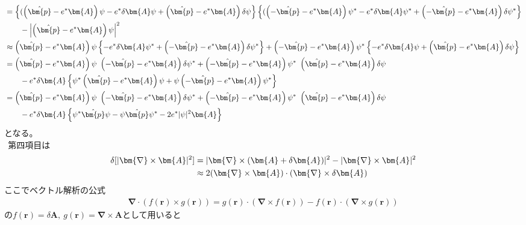 \documentclass[dvipdfmx, 11pt, a4paper]{jsarticle}
\numberwithin{equation}{section}
\theoremstyle{definition}
\begin{document}
\begin{derivationBox}
\begin{align}
            &= \left\{ (\left( \hat{\bm{p}} -e^*\bm{A} \right) \psi -e^* \delta \bm{A} \psi  + \left( \hat{\bm{p}} -e^*\bm{A}  \right)  \delta \psi  \right\} \left\{ (\left( -\hat{\bm{p}} -e^*\bm{A} \right) \psi^* -e^*\delta \bm{A} \psi^*+ \left( -\hat{\bm{p}} -e^*\bm{A}  \right)  \delta \psi^*  \right\} \notag \\
            &\ \ \ \ \ \ - \left|  \left( \hat{\bm{p}} -e^*\bm{A} \right) \psi \right|^2 \notag \\
            &\approx  \left( \hat{\bm{p}} -e^*\bm{A} \right) \psi \left\{ -e^*\delta \bm{A} \psi^*+ \left( -\hat{\bm{p}} -e^*\bm{A}  \right)  \delta \psi^*  \right\} + \left( -\hat{\bm{p}} -e^*\bm{A} \right) \psi^* \left\{ -e^* \delta \bm{A} \psi  + \left( \hat{\bm{p}} -e^*\bm{A}  \right)  \delta \psi \right\}\notag \\
            &= \left( \hat{\bm{p}} -e^*\bm{A} \right) \psi\ \left( -\hat{\bm{p}} -e^*\bm{A}  \right)  \delta \psi^* + \left( -\hat{\bm{p}} -e^*\bm{A} \right) \psi^*\ \left( \hat{\bm{p}} -e^*\bm{A}  \right)  \delta \psi \notag \\
            &\ \ \ \ \ \ -e^* \delta \bm{A} \left\{ \psi^* \left( \hat{\bm{p}} -e^*\bm{A} \right) \psi + \psi \left( -\hat{\bm{p}} -e^*\bm{A} \right) \psi^* \right\} \notag \\
            &= \left( \hat{\bm{p}} -e^*\bm{A} \right) \psi\ \left( -\hat{\bm{p}} -e^*\bm{A}  \right)  \delta \psi^* + \left( -\hat{\bm{p}} -e^*\bm{A} \right) \psi^*\ \left( \hat{\bm{p}} -e^*\bm{A}  \right)  \delta \psi \notag \\
            &\ \ \ \ \ \ -e^* \delta \bm{A} \left\{ \psi^*  \hat{\bm{p}}  \psi - \psi \hat{\bm{p}} \psi^* -2e^*|\psi|^2\bm{A} \right\}
        \end{align}
        となる。\\
        $\ \ $第四項目は
        \begin{align}
            \delta[|\bm{\nabla} \times \bm{A}|^2 ] &= |\bm{\nabla} \times( \bm{A} + \delta \bm{A})|^2 - |\bm{\nabla} \times \bm{A}|^2 \notag \\
            &\approx 2(\bm{\nabla} \times \bm{A}) \cdot (\bm{\nabla} \times \delta \bm{A})
        \end{align}
        ここでベクトル解析の公式
        \begin{align}
            \bm{\nabla} \cdot (f(\bm{r}) \times g(\bm{r})) = g(\bm{r})\cdot (\bm{\nabla} \times f(\bm{r})) - f(\bm{r})\cdot (\bm{\nabla} \times g(\bm{r})) 
        \end{align}
        の$f(\bm{r}) = \delta \bm{A},\ g(\bm{r}) = \bm{\nabla}\times \bm{A}$として用いると

\end{derivationBox}
\end{document}
